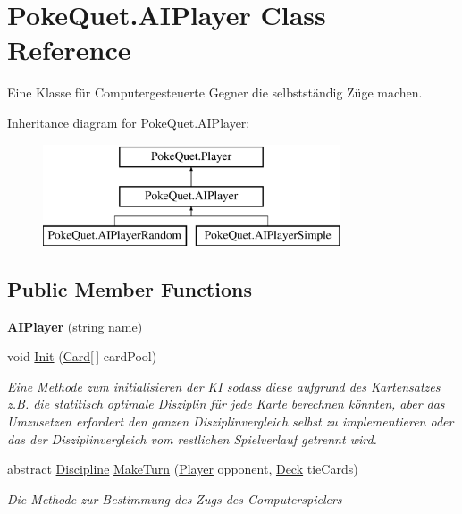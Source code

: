\hypertarget{class_poke_quet_1_1_a_i_player}{}\section{Poke\+Quet.\+A\+I\+Player Class Reference}
\label{class_poke_quet_1_1_a_i_player}


Eine Klasse für Computergesteuerte Gegner die selbstständig Züge machen.  


Inheritance diagram for Poke\+Quet.\+A\+I\+Player\+:\begin{figure}[H]
\begin{center}
\leavevmode
\includegraphics[height=3.000000cm]{class_poke_quet_1_1_a_i_player}
\end{center}
\end{figure}
\subsection*{Public Member Functions}
\begin{DoxyCompactItemize}
\item 
\mbox{\label{class_poke_quet_1_1_a_i_player_aa003be7c23e044540792bfb254b58b45}} 
{\bfseries A\+I\+Player} (string name)
\item 
void \mbox{\hyperlink{class_poke_quet_1_1_a_i_player_a91da43db7587617dbfe7858a6fafd434}{Init}} (\mbox{\hyperlink{class_poke_quet_1_1_card}{Card}}\mbox{[}$\,$\mbox{]} card\+Pool)
\begin{DoxyCompactList}\small\item\em Eine Methode zum initialisieren der KI sodass diese aufgrund des Kartensatzes z.\+B. die statitisch optimale Disziplin für jede Karte berechnen könnten, aber das Umzusetzen erfordert den ganzen Disziplinvergleich selbst zu implementieren oder das der Disziplinvergleich vom restlichen Spielverlauf getrennt wird. \end{DoxyCompactList}\item 
abstract \mbox{\hyperlink{namespace_poke_quet_aa425f1b8cf90847021fe1177d6a7199d}{Discipline}} \mbox{\hyperlink{class_poke_quet_1_1_a_i_player_ae2862ead657c524614793ea4d3ebf80b}{Make\+Turn}} (\mbox{\hyperlink{class_poke_quet_1_1_player}{Player}} opponent, \mbox{\hyperlink{class_poke_quet_1_1_deck}{Deck}} tie\+Cards)
\begin{DoxyCompactList}\small\item\em Die Methode zur Bestimmung des Zugs des Computerspielers \end{DoxyCompactList}\end{DoxyCompactItemize}
